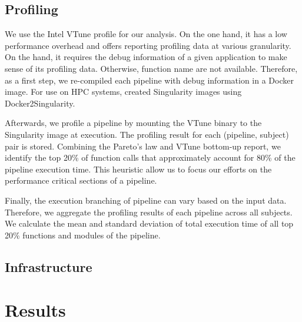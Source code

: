 \documentclass[conference]{IEEEtran}
\begin{document}


\subsection{Profiling}
We use the Intel VTune profile for our analysis. On the one hand, it has a low performance overhead and offers reporting profiling data at various granularity. On the hand, it requires the debug information of a given application to make sense of its profiling data. Otherwise, function name are not available. Therefore, as a first step, we re-compiled each pipeline with debug information in a Docker image. For use on HPC systems, created Singularity images using Docker2Singularity.

Afterwards, we profile a pipeline by mounting the VTune binary to the Singularity image at execution. The profiling result for each (pipeline, subject) pair is stored. Combining the Pareto's law and VTune bottom-up report, we identify the top 20\% of function calls that approximately account for 80\% of the pipeline execution time. This heuristic allow us to focus our efforts on the performance critical sections of a pipeline.

Finally, the execution branching of pipeline can vary based on the input data. Therefore, we aggregate the profiling results of each pipeline across all subjects. We calculate the mean and standard deviation of total execution time of all top 20\% functions and modules of the pipeline.

\subsection{Infrastructure}

\section{Results}
\end{document}
